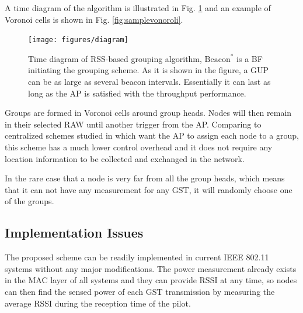 A time diagram of the algorithm is illustrated in Fig. \ref{fig:diagram} and an example of Voronoi cells is shown in Fig. \ref{fig:samplevonoroli}.


\begin{figure}
  \centering
  \texttt{[image: figures/diagram]}
  \caption{Time diagram of RSS-based grouping algorithm, $\text{Beacon}^{\ast}$ is a BF initiating the grouping scheme. As it is shown in the figure, a GUP can be as large as several beacon intervals. Essentially it can last as long as the AP is satisfied with the throughput performance.}
  \label{fig:diagram}
\end{figure}



Groups are formed in Voronoi cells around group heads. Nodes will then remain in their selected RAW until another trigger from the AP.
Comparing to centralized schemes studied in \cite{zheng2014performance} which want the AP to assign each node to a group, this scheme has a much lower control overhead and it does not require any location information to be collected and exchanged in the network.%

In the rare case that a node is very far from all the group heads, which means that it can not have any measurement for any GST, it will randomly choose one of the groups.
 


\subsection{Implementation Issues}
The proposed scheme can be readily implemented in current IEEE 802.11 systems without any major modifications. The power measurement already exists in the MAC layer of all systems and they can provide RSSI at any time, so nodes can then find the sensed power of each GST transmission by measuring the average RSSI during the reception time of the pilot. 

